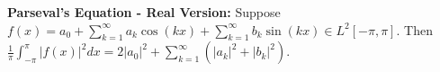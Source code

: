 {\bf Parseval's Equation - Real Version: } Suppose $f(x)=a_0+\sum_{k=1}^{\infty} a_k\cos(kx)+\sum_{k=1}^{\infty}b_k\sin(kx)\in L^2[-\pi,\pi]$. Then $\frac{1}{\pi}\int_{-\pi}^{\pi}|f(x)|^2dx=2|a_0|^2+\sum_{k=1}^{\infty}\left(|a_k|^2+|b_k|^2\right)$.